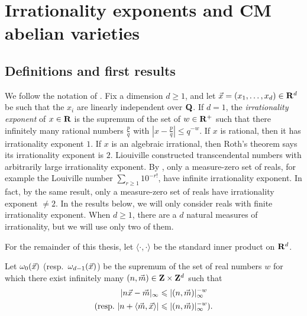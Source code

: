 
\chapter{Irrationality exponents and CM abelian varieties}\label{chapter:irrationality-exponent}





\section{Definitions and first results}

We follow the notation of \cite{laurent-2009}. Fix a dimension 
$d\geqslant 1$, and let $\vec{x}=(x_1,\dots,x_d)\in \mathbf{R}^d$ be such that the $x_i$ 
are linearly independent over $\mathbf{Q}$. If $d = 1$, the \emph{irrationality 
exponent} of $x\in \mathbf{R}$ is the supremum of the set of $w\in \mathbf{R}^+$ such that 
there infinitely many rational numbers $\frac p q$ with 
$\left| x - \frac p q\right| \leqslant q^{-w}$. If $x$ is rational, then it has 
irrationality exponent $1$. If $x$ is an algebraic irrational, then Roth's 
theorem says its irrationality exponent is $2$. Liouiville constructed 
transcendental numbers with arbitrarily large irrationality exponent. By 
\cite[Th.~E.3]{bugeaud--2012}, only a measure-zero set of reals, for example 
the Louiville number $\sum_{r\geqslant 1} 10^{-r!}$, have infinite 
irrationality exponent. In fact, by the same result, only a measure-zero set of 
reals have irrationality exponent $\ne 2$. In the results below, we will only 
consider reals with finite irrationality exponent. When $d\geqslant 1$, there 
are a $d$ natural measures of irrationality, but we will use only two of them. 

For the remainder of this thesis, let $\langle \cdot,\cdot\rangle$ be the 
standard inner product on $\mathbf{R}^d$. 

\begin{definition}\label{def:approx-exp}
Let $\omega_0(\vec{x})$ (resp.~$\omega_{d-1}(\vec{x})$) be the supremum of the set of 
real numbers $w$ for which there exist infinitely many 
$(n,\vec{m})\in \mathbf{Z}\times\mathbf{Z}^d$ such that 
\begin{align*}
	|n \vec{x} - \vec{m}|_\infty 
		&\leqslant |(n,\vec{m})|_\infty^{-w} \\
	\text{(resp.~}
	|n +\langle \vec{m},\vec{x}\rangle| 
		&\leqslant |(n,\vec{m})|_\infty^{-w} \text{).}
\end{align*}
\end{definition}

